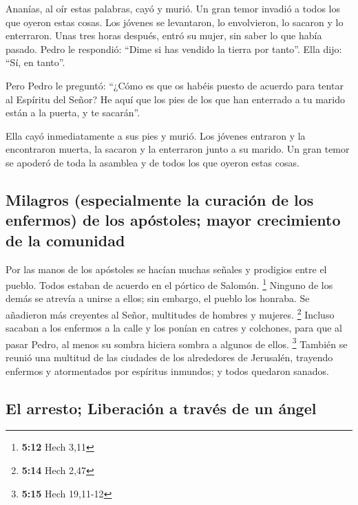 \begin{paracol}{2}
 Ananías, al oír estas palabras, cayó y murió. Un gran
temor invadió a todos los que oyeron estas cosas.  Los
jóvenes se levantaron, lo envolvieron, lo sacaron y lo enterraron.
 Unas tres horas después, entró su mujer, sin saber lo que
había pasado.  Pedro le respondió: ``Dime si has vendido
la tierra por tanto''. Ella dijo: ``Sí, en tanto''.

 Pero Pedro le preguntó: ``¿Cómo es que os habéis puesto
de acuerdo para tentar al Espíritu del Señor? He aquí que los pies de
los que han enterrado a tu marido están a la puerta, y te sacarán''.

 Ella cayó inmediatamente a sus pies y murió. Los jóvenes
entraron y la encontraron muerta, la sacaron y la enterraron junto a su
marido.  Un gran temor se apoderó de toda la asamblea y
de todos los que oyeron estas cosas.

\hypertarget{milagros-especialmente-la-curaciuxf3n-de-los-enfermos-de-los-apuxf3stoles-mayor-crecimiento-de-la-comunidad}{%
\subsection{Milagros (especialmente la curación de los enfermos) de los
apóstoles; mayor crecimiento de la
comunidad}\label{milagros-especialmente-la-curaciuxf3n-de-los-enfermos-de-los-apuxf3stoles-mayor-crecimiento-de-la-comunidad}}

 Por las manos de los apóstoles se hacían muchas señales
y prodigios entre el pueblo. Todos estaban de acuerdo en el pórtico de
Salomón. \footnote{\textbf{5:12} Hech 3,11}  Ninguno de
los demás se atrevía a unirse a ellos; sin embargo, el pueblo los
honraba.  Se añadieron más creyentes al Señor, multitudes
de hombres y mujeres. \footnote{\textbf{5:14} Hech 2,47} 
Incluso sacaban a los enfermos a la calle y los ponían en catres y
colchones, para que al pasar Pedro, al menos su sombra hiciera sombra a
algunos de ellos. \footnote{\textbf{5:15} Hech 19,11-12} 
También se reunió una multitud de las ciudades de los alrededores de
Jerusalén, trayendo enfermos y atormentados por espíritus inmundos; y
todos quedaron sanados.

\hypertarget{el-arresto-liberaciuxf3n-a-travuxe9s-de-un-uxe1ngel}{%
\subsection{El arresto; Liberación a través de un
ángel}\label{el-arresto-liberaciuxf3n-a-travuxe9s-de-un-uxe1ngel}}


\end{paracol}
